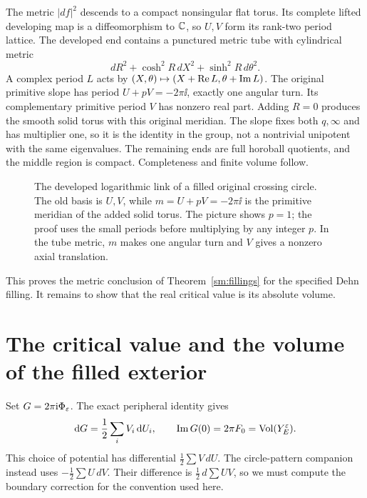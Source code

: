 The metric $|df|^2$ descends to a compact nonsingular flat torus.
Its complete lifted developing map is a diffeomorphism to $\mathbb C$,
so $U,V$ form its rank-two period lattice. The developed
end contains a punctured metric tube with cylindrical metric
\begin{equation}\label{sm:tube}
             dR^2+\cosh^2R\,dX^2+\sinh^2R\,d\theta^2.
\end{equation}
A complex period $L$ acts by
$(X,\theta)\mapsto(X+\operatorname{Re} L,\theta+\operatorname{Im} L)$.
The original primitive slope has period $U+pV=-2\pi\ii$,
exactly one angular turn. Its complementary primitive period $V$
has nonzero real part. Adding $R=0$ produces the smooth solid
torus with this original meridian. The slope fixes both
$q,\infty$ and has multiplier one, so it is the identity in the
group, not a nontrivial unipotent with the same eigenvalues.
The remaining ends are full horoball quotients, and the middle
region is compact. Completeness and finite volume follow.

\begin{figure}[ht]
\centering
\caption{The developed logarithmic link of a filled original
crossing circle. The old basis is $U,V$, while
$m=U+pV=-2\pi\ii$ is the primitive meridian of the added solid
torus. The picture shows $p=1$; the proof uses the small periods
before multiplying by any integer $p$. In the tube metric,
$m$ makes one angular turn and $V$ gives a nonzero axial
translation.}
\label{sm:period-figure}
\end{figure}

This proves the metric conclusion of Theorem~\ref{sm:fillings} for
the specified Dehn filling. It remains to show that the real critical
value is its absolute volume.

\section{The critical value and the volume of the filled exterior}\label{sm:absolute}

Set $G=2\pi\mathrm i\Phi_\varepsilon$. The exact peripheral identity gives
\begin{equation}\label{sm:primitive}
 \mathrm d G=\frac12\sum_i V_i\,\mathrm d U_i,\qquad
 \operatorname{Im} G(0)=2\pi F_0=\operatorname{Vol}(Y_E^\varepsilon).
\end{equation}
This choice of potential has differential $\tfrac12\sum V\,dU$.
The circle-pattern companion instead uses
$-\tfrac12\sum U\,dV$. Their difference is
$\tfrac12\,d\sum UV$, so we must compute the boundary correction
for the convention used here.

